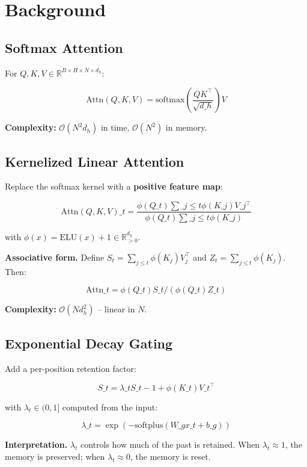 
\section{Background}

\subsection{Softmax Attention}

For $Q, K, V \in \mathbb{R}^{B \times H \times N \times d_h}$:

\[
\text{Attn}(Q, K, V) = \text{softmax}\!\left(\frac{Q K^\top}{\sqrt{d\_h}}\right) V
\tag{3.1}
\]

\textbf{Complexity:} $\mathcal{O}(N^2 d_h)$ in time, $\mathcal{O}(N^2)$ in memory.

\subsection{Kernelized Linear Attention}

Replace the softmax kernel with a \textbf{positive feature map}:

\[
\text{Attn}(Q, K, V)\_t = \frac{\phi(Q\_t) \sum\_{j \leq t} \phi(K\_j) V\_j^\top}{\phi(Q\_t) \sum\_{j \leq t} \phi(K\_j)}
\tag{3.2}
\]

with $\phi(x) = \text{ELU}(x) + 1 \in \mathbb{R}_{>0}^{d_h}$.

\textbf{Associative form.} Define $S_t = \sum_{j \leq t} \phi(K_j) V_j^\top$ and 
$Z_t = \sum_{j \leq t} \phi(K_j)$. Then:

\[
\text{Attn}\_t = \phi(Q\_t) S\_t / (\phi(Q\_t) Z\_t)
\tag{3.3}
\]

\textbf{Complexity:} $\mathcal{O}(N d_h^2)$ -- linear in $N$.

\subsection{Exponential Decay Gating}

Add a per-position retention factor:

\[
S\_t = \lambda\_t S\_{t-1} + \phi(K\_t) V\_t^\top
\tag{3.4}
\]

with $\lambda_t \in (0, 1]$ computed from the input:

\[
\lambda\_t = \exp(-\text{softplus}(W\_g x\_t + b\_g))
\tag{3.5}
\]

\textbf{Interpretation.} $\lambda_t$ controls how much of the past is retained. 
When $\lambda_t \approx 1$, the memory is preserved; when $\lambda_t \approx 0$, 
the memory is reset.

